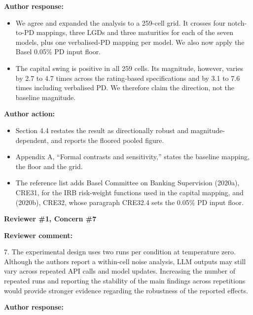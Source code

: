 \documentclass[11pt]{article}
\newcommand{\rvcomment}[1]{{\color{ReviewerGreen}#1}}
\newcommand{\concern}[1]{\textbf{\color{ReviewerGreen}#1}}
\begin{document}
\textbf{Author response:}

\begin{itemize}

\item We agree and expanded the analysis to a 259-cell grid. It crosses four notch-to-PD mappings, three LGDs and three maturities for each of the seven models, plus one verbalised-PD mapping per model. We also now apply the Basel 0.05\% PD input floor.

\item The capital swing is positive in all 259 cells. Its magnitude, however, varies by 2.7 to 4.7 times across the rating-based specifications and by 3.1 to 7.6 times including verbalised PD. We therefore claim the direction, not the baseline magnitude.

\end{itemize}

\textbf{Author action:}

\begin{itemize}

\item Section 4.4 restates the result as directionally robust and magnitude-dependent, and reports the floored pooled figure.

\item Appendix A, ``Formal contrasts and sensitivity,'' states the baseline mapping, the floor and the grid.

\item The reference list adds Basel Committee on Banking Supervision (2020a), CRE31, for the IRB risk-weight functions used in the capital mapping, and (2020b), CRE32, whose paragraph CRE32.4 sets the 0.05\% PD input floor.

\end{itemize}

\vspace{12pt}
\concern{Reviewer \#1, Concern \#7}

\concern{Reviewer comment:}

\rvcomment{7. The experimental design uses two runs per condition at temperature zero. Although the authors report a within-cell noise analysis, LLM outputs may still vary across repeated API calls and model updates. Increasing the number of repeated runs and reporting the stability of the main findings across repetitions would provide stronger evidence regarding the robustness of the reported effects.}

\textbf{Author response:}
\end{document}
